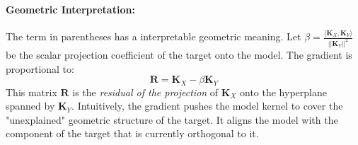 \documentclass[11pt]{article}
\begin{document}
	\paragraph{Geometric Interpretation:}
	The term in parentheses has a interpretable geometric meaning. Let $\beta = \frac{\langle \mathbf{K}_X, \mathbf{K}_Y \rangle}{||\mathbf{K}_Y||^2}$ be the scalar projection coefficient of the target onto the model. The gradient is proportional to:
	\begin{equation}
		\mathbf{R} = \mathbf{K}_X - \beta \mathbf{K}_Y
	\end{equation}
	This matrix $\mathbf{R}$ is the \emph{residual of the projection} of $\mathbf{K}_X$ onto the hyperplane spanned by $\mathbf{K}_Y$. Intuitively, the gradient pushes the model kernel to cover the "unexplained" geometric structure of the target. It aligns the model with the component of the target that is currently orthogonal to it. \\
	
\end{document}
